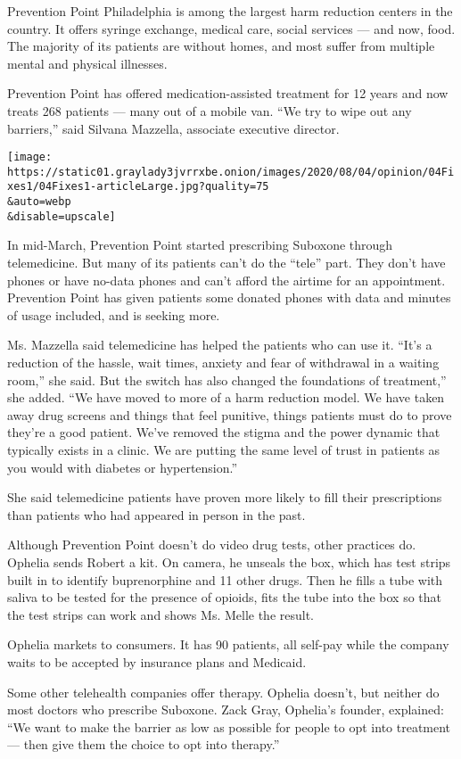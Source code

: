 Prevention Point Philadelphia is among the largest harm reduction
centers in the country. It offers syringe exchange, medical care, social
services --- and now, food. The majority of its patients are without
homes, and most suffer from multiple mental and physical illnesses.

Prevention Point has offered medication-assisted treatment for 12 years
and now treats 268 patients --- many out of a mobile van. ``We try to
wipe out any barriers,'' said Silvana Mazzella, associate executive
director.

\texttt{[image: https://static01.graylady3jvrrxbe.onion/images/2020/08/04/opinion/04Fixes1/04Fixes1-articleLarge.jpg?quality=75\\\&auto=webp\\\&disable=upscale]}

In mid-March, Prevention Point started prescribing Suboxone through
telemedicine. But many of its patients can't do the ``tele'' part. They
don't have phones or have no-data phones and can't afford the airtime
for an appointment. Prevention Point has given patients some donated
phones with data and minutes of usage included, and is seeking more.

Ms. Mazzella said telemedicine has helped the patients who can use it.
``It's a reduction of the hassle, wait times, anxiety and fear of
withdrawal in a waiting room,'' she said. But the switch has also
changed the foundations of treatment,'' she added. ``We have moved to
more of a harm reduction model. We have taken away drug screens and
things that feel punitive, things patients must do to prove they're a
good patient. We've removed the stigma and the power dynamic that
typically exists in a clinic. We are putting the same level of trust in
patients as you would with diabetes or hypertension.''

She said telemedicine patients have proven more likely to fill their
prescriptions than patients who had appeared in person in the past.

Although Prevention Point doesn't do video drug tests, other practices
do. Ophelia sends Robert a kit. On camera, he unseals the box, which has
test strips built in to identify buprenorphine and 11 other drugs. Then
he fills a tube with saliva to be tested for the presence of opioids,
fits the tube into the box so that the test strips can work and shows
Ms. Melle the result.

Ophelia markets to consumers. It has 90 patients, all self-pay while the
company waits to be accepted by insurance plans and Medicaid.

Some other telehealth companies offer therapy. Ophelia doesn't, but
neither do most doctors who prescribe Suboxone. Zack Gray, Ophelia's
founder, explained: ``We want to make the barrier as low as possible for
people to opt into treatment --- then give them the choice to opt into
therapy.''

